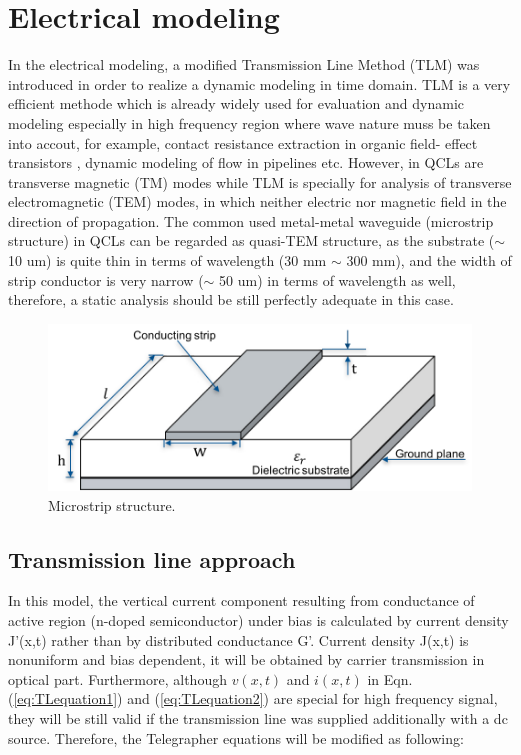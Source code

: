 \documentclass[11pt,final]{scrbook}
\begin{document}
\section{Electrical modeling}
In the electrical modeling, a modified Transmission Line Method (TLM) was introduced in order to realize a dynamic modeling in time domain. TLM is a very efficient methode which is already widely used for evaluation and dynamic modeling especially in high frequency region where wave nature muss be taken into accout, for example, contact resistance extraction in organic field- effect transistors \cite{xu2010modified}, dynamic modeling of flow in pipelines \cite{johnston2014enhanced} etc. However, in QCLs are transverse magnetic (TM) modes \cite{yan2009directional} while TLM is specially for analysis of transverse electromagnetic (TEM) modes, in which neither electric nor magnetic field in the direction of propagation. The common used metal-metal waveguide (microstrip structure) in QCLs can be regarded as quasi-TEM structure, as the substrate ($ \sim $ 10 um) is quite thin in terms of wavelength (30 mm $ \sim $ 300 mm), and the width of strip conductor is very narrow ($ \sim $ 50 um) in terms of wavelength as well, therefore, a static analysis should be still perfectly adequate in this case.

\begin{figure}[htbp]
\begin{center}
\includegraphics[scale=0.8]{images/Microstrip.pdf}
\caption{Microstrip structure.}
\label{fig:Microstrip}
\end{center}
\end{figure}

\subsection{Transmission line approach}
In this model, the vertical current component resulting from conductance of active region (n-doped semiconductor) under bias is calculated by current density J'(x,t) rather than by distributed conductance G'. Current density J(x,t) is nonuniform and bias dependent, it will be obtained by carrier transmission in optical part. Furthermore, although $v(x,t)$ and $i(x,t)$ in Eqn. (\ref{eq:TLequation1}) and (\ref{eq:TLequation2}) are special for high frequency signal, they will be still valid if the transmission line was supplied additionally with a dc source. Therefore, the Telegrapher equations will be modified as following:
\end{document}
